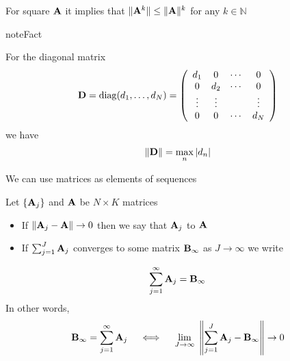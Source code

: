 \documentclass[letterpaper,10pt,english]{jupyterBook}
\begin{document}
\sphinxAtStartPar
For square \({\bf A}\) it implies that \(\|{\bf A}^k\| \leq \|{\bf A} \|^k\) for any \(k \in \mathbb{N}\)

\begin{sphinxadmonition}{note}{Fact}

\sphinxAtStartPar
For the diagonal matrix
\begin{equation*}
\begin{split}
%
{\bf D} = 
\mathrm{diag}(d_1, \ldots, d_N) 
=
\left(
\begin{array}{cccc}
d_1 & 0 & \cdots & 0 \\
0 & d_2 & \cdots & 0 \\
\vdots & \vdots & & \vdots \\
0 & 0 & \cdots & d_N \\
\end{array}
\right)
%
\end{split}
\end{equation*}
\sphinxAtStartPar
we have
\begin{equation*}
\begin{split} 
%
\| {\bf D} \| = \max_n |d_n|
%
\end{split}
\end{equation*}\end{sphinxadmonition}

\sphinxAtStartPar
We can use matrices as elements of sequences

\sphinxAtStartPar
Let \(\{ {\bf A}_j \}\) and \({\bf A}\) be \(N \times K\) matrices
\begin{itemize}
\item {} 
\sphinxAtStartPar
If \(\| {\bf A}_j - {\bf A} \| \to 0\) then we say that \({\bf A}_j\)
 to \({\bf A}\)

\item {} 
\sphinxAtStartPar
If \(\sum_{j=1}^J {\bf A}_j\) converges to some matrix
\({\bf B}_{\infty}\) as \(J \to \infty\) we write

\end{itemize}
\begin{equation*}
\begin{split}
%
\sum_{j=1}^{\infty} {\bf A}_j = {\bf B}_{\infty}
%
\end{split}
\end{equation*}
\sphinxAtStartPar
In other words,
\begin{equation*}
\begin{split}
%
{\bf B}_{\infty} = \sum_{j=1}^{\infty} {\bf A}_j 
\quad \iff \quad
\lim_{J \to \infty}
\;
\left\| \sum_{j=1}^J {\bf A}_j - {\bf B}_{\infty} \right\|
\to 0
%
\end{split}
\end{equation*}
\end{document}
